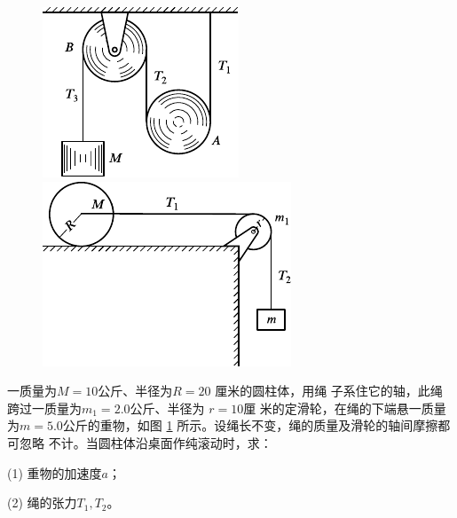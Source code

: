 \begin{exercises}
\begin{figure}[h]
    \begin{minipage}[b]{0.4\linewidth}
        \centering
        \includegraphics{figure/fig10.30}
        \caption{}
        \label{fig:10.30}
    \end{minipage}
    \begin{minipage}[b]{0.6\linewidth}
        \centering
        \includegraphics{figure/fig10.31}
        \caption{}
        \label{fig:10.31}
    \end{minipage}
\end{figure}

\exercise 一质量为$  M = 1 0   $公斤、半径为$  R = 2 0  $ 厘米的圆柱体，用绳
子系住它的轴，此绳跨过一质量为$  m _ { 1 } = 2 . 0   $公斤、半径为 $ r = 1 0   $厘
米的定滑轮，在绳的下端悬一质量为$  m = 5 . 0   $公斤的重物，如图
\ref{fig:10.31} 所示。设绳长不变，绳的质量及滑轮的轴间摩擦都可忽略
不计。当圆柱体沿桌面作纯滚动时，求：

\clearpage
(1) 重物的加速度$ a $；

(2) 绳的张力$  T _ { 1 } , T _ { 2 }  $。


\end{exercises}
